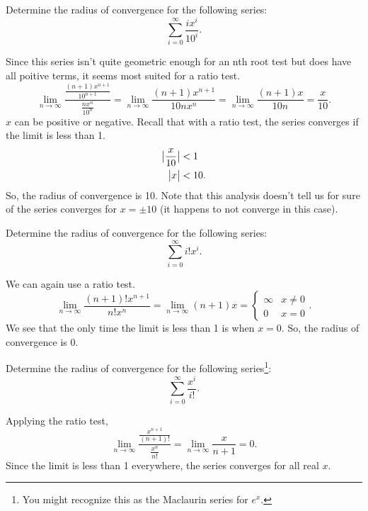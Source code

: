 \begin{example}
	Determine the radius of convergence for the following series:
	\begin{equation*}
		\sum_{i=0}^{\infty}{\frac{ix^i}{10^i}}.
	\end{equation*}
\end{example}
Since this series isn't quite geometric enough for an nth root test but does have all poitive terms, it seems most suited for a ratio test.
\begin{equation*}
	\lim_{n\to\infty}{\frac{\frac{(n+1)x^{n+1}}{10^{n+1}}}{\frac{nx^n}{10^n}}} = \lim_{n\to\infty}{\frac{(n+1)x^{n+1}}{10nx^n}} = \lim_{n\to\infty}{\frac{(n+1)x}{10n}} = \frac{x}{10}.
\end{equation*}
\indent
$x$ can be positive or negative.
Recall that with a ratio test, the series converges if the limit is less than 1.
\begin{align*}
	\big\lvert \frac{x}{10} \big\rvert &< 1 \\
	\big\lvert x \big\rvert &< 10.
\end{align*}
\indent
So, the radius of convergence is 10.
Note that this analysis doesn't tell us for sure of the series converges for $x=\pm 10$ (it happens to not converge in this case).

\begin{example}
	Determine the radius of convergence for the following series:
	\begin{equation*}
		\sum_{i=0}^{\infty}{i!x^i}.
	\end{equation*}
\end{example}
We can again use a ratio test.
\begin{equation*}
	\lim_{n\to\infty}{\frac{(n+1)!x^{n+1}}{n!x^n}} = \lim_{n\to\infty}{(n+1)x} = \begin{cases} \infty & x\neq 0 \\ 0 & x = 0 \end{cases}.
\end{equation*}
\indent
We see that the only time the limit is less than 1 is when $x=0$.
So, the radius of convergence is 0.

\begin{example}
	Determine the radius of convergence for the following series\footnote{You might recognize this as the Maclaurin series for $e^x$.}:
	\begin{equation*}
		\sum_{i=0}^{\infty}{\frac{x^i}{i!}}.
	\end{equation*}
\end{example}
Applying the ratio test,
\begin{equation*}
	\lim_{n\to\infty}{\frac{\frac{x^{n+1}}{(n+1)!}}{\frac{x^n}{n!}}} = \lim_{n\to\infty}{\frac{x}{n+1}} = 0.
\end{equation*}
\indent
Since the limit is less than 1 everywhere, the series converges for all real $x$.

